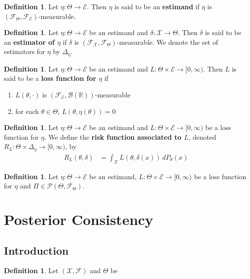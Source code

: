 \documentclass[12pt]{amsart}
\theoremstyle{definition}
\newtheorem{defn}[definition]{Definition}
\newcommand{\del}{\delta}
\newcommand{\Del}{\Delta}
\newcommand{\R}{\mathbb{R}}
\newcommand{\MB}{\mathcal{B}}
\newcommand{\MF}{\mathcal{F}}
\newcommand{\MP}{\mathcal{P}}
\newcommand{\ME}{\mathcal{E}}
\newcommand{\MX}{\mathcal{X}}
\newcommand{\Rg}{[0,\infty)}
\newcommand{\dP}{\, d P}
\begin{document}
	\begin{defn}
		Let $\eta: \Theta \rightarrow \ME$. Then $\eta$ is said to be an \textbf{estimand} if $\eta$ is $(\MF_{\Theta}, \MF_{\ME})$-measurable. 
	\end{defn}
	
	\begin{defn}
		Let $\eta: \Theta \rightarrow \ME$ be an estimand and $\del: \MX \rightarrow \Theta$. Then $\del$ is said to be an \textbf{estimator of $\eta$} if $\del$ is $(\MF_{\MX}, \MF_{\Theta})$-measurable. We denote the set of estimators for $\eta$ by $\Del_{\eta}$.
	\end{defn}
	
	\begin{defn}
		Let $\eta: \Theta \rightarrow \ME$ be an estimand and $L: \Theta \times \ME \rightarrow \Rg$. Then $L$ is said to be a \textbf{loss function for $\eta$} if 
		\begin{enumerate}
			\item $L(\theta, \cdot)$ is $(\MF_{\ME}, \MB(\R))$-measurable
			\item for each $\theta \in \Theta$, $L(\theta, \eta(\theta)) = 0 $
		\end{enumerate}
	\end{defn}
	
	\begin{defn}
		Let $\eta: \Theta \rightarrow \ME$ be an estimand and $L: \Theta \times \ME \rightarrow \Rg$ be a loss function for $\eta$. We define the \textbf{risk function associated to $L$}, denoted $R_L: \Theta \times \Del_{\eta} \rightarrow \Rg$, by 
		\begin{align*}
			R_L(\theta, \del) 
			& = \int_{\MX} L(\theta, \del(x)) \dP_{\theta}(x)
		\end{align*}
	\end{defn}
	
	\begin{defn}
		Let $\eta: \Theta \rightarrow \ME$ be an estimand, $L: \Theta \times \ME \rightarrow \Rg$ be a loss function for $\eta$ and $\Pi \in \MP(\Theta, \MF_{\Theta})$. 
	\end{defn}
	
	
	
	
	
	
	
	
	
	
	
	
	
	
	
	
	
	
	
	
	
	
	
	
	
	
	
	\newpage
	\section{Posterior Consistency}
	
	\subsection{Introduction}
	
	\begin{defn}
	Let $(\MX, \MF)$ and $\Theta$ be
	\end{defn}	
	

	
\end{document}
